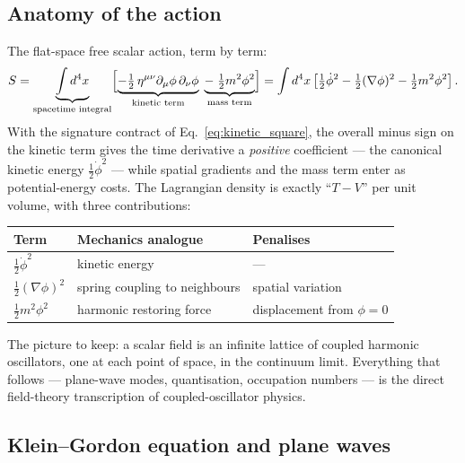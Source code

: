 \documentclass[12pt]{article}
\begin{document}
\subsection{Anatomy of the action}
\label{sec:anatomy}

The flat-space free scalar action, term by term:
%
\begin{equation*}
  S = \underbrace{\int d^4x}_{\text{spacetime integral}}
  \Bigl[
  \underbrace{-\tfrac{1}{2}\,\eta^{\mu\nu}\partial_\mu\phi\,\partial_\nu\phi}_{\text{kinetic term}}
  \;
  \underbrace{-\;\tfrac{1}{2}m^2\phi^2}_{\text{mass term}}
  \Bigr]
  = \int d^4x \left[ \tfrac{1}{2}\dot\phi^2 - \tfrac{1}{2}(\nabla\phi)^2
      - \tfrac{1}{2}m^2\phi^2 \right].
\end{equation*}
%
With the signature contract of Eq.~\eqref{eq:kinetic_square}, the
overall minus sign on the kinetic term gives the time derivative a
\emph{positive} coefficient --- the canonical kinetic energy
$\tfrac{1}{2}\dot\phi^2$ --- while spatial gradients and the mass term
enter as potential-energy costs.  The Lagrangian density is exactly
``$T - V$'' per unit volume, with three contributions:
%
\begin{center}
\begin{tabular}{@{}lll@{}}
\toprule
Term & Mechanics analogue & Penalises \\
\midrule
$\tfrac{1}{2}\dot\phi^2$        & kinetic energy      & --- \\
$\tfrac{1}{2}(\nabla\phi)^2$    & spring coupling to neighbours & spatial variation \\
$\tfrac{1}{2}m^2\phi^2$         & harmonic restoring force      & displacement from $\phi=0$ \\
\bottomrule
\end{tabular}
\end{center}
%
The picture to keep: a scalar field is an infinite lattice of coupled
harmonic oscillators, one at each point of space, in the continuum
limit.  Everything that follows --- plane-wave modes, quantisation,
occupation numbers --- is the direct field-theory transcription of
coupled-oscillator physics.

\subsection{Klein--Gordon equation and plane waves}
\label{sec:kg}
\end{document}
